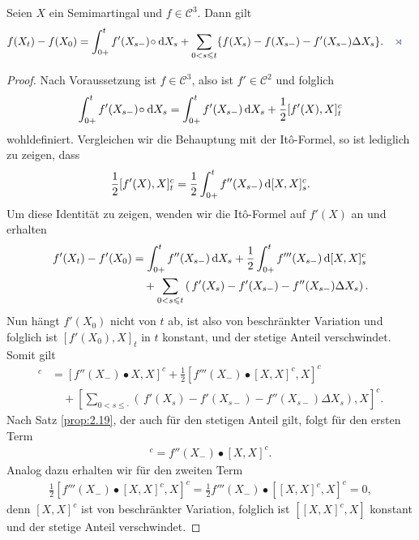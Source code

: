 \begin{theorem}
  Seien $X$ ein Semimartingal und $f\in\mathcal{C}^3$. Dann gilt
\begin{align*}
  f(X_t)-f(X_0) & = \int_{0+}^t f'(X_{s-})\dcirc \dX_s + \sum_{0<s\le t}
  \{f(X_s)-f(X_{s-}) -f'(X_{s-}) \Delta X_s \}.\fish
\end{align*}
\end{theorem}
\begin{proof}
Nach Voraussetzung ist $f\in \mathcal{C}^3$, also ist $f'\in\mathcal{C}^2$ und
folglich
\begin{align*}
\int_{0+}^t f'(X_{s-})\!\circ\! \,\mathrm{d} X_s = 
\int_{0+}^t f'(X_{s-}) \,\mathrm{d} X_s + \frac{1}{2}[f'(X),X]^c_t
\end{align*}
wohldefiniert. Vergleichen wir die Behauptung mit der Itô-Formel, so ist
lediglich zu zeigen, dass
\begin{align*}
\frac{1}{2}[f'(X),X]_t^c = 
\frac{1}{2}\int_{0+}^t f''(X_{s-})\,\mathrm{d}[X,X]_s^c.
\end{align*}
Um diese Identität zu zeigen, wenden wir die Itô-Formel auf $f'(X)$ an und
erhalten
\begin{align*}
f'(X_t)-f'(X_0) 
  & = \int_{0+}^t f''(X_{s-})\,\mathrm{d} X_s + \frac{1}{2} \int_{0+}^t f'''(X_{s-})\,
  \mathrm{d}[X,X]_s^c \\
  & \quad + \sum_{0<s\leqslant t} \left(\,f'(X_s)-f'(X_{s-}) -f''(X_{s-}) \Delta
  X_s\right).
\end{align*}
Nun hängt $f'(X_0)$ nicht von $t$ ab, ist also von beschränkter Variation und
folglich ist $[f'(X_0),X]_t$ in $t$ konstant, und der stetige Anteil
verschwindet.
Somit gilt
\begin{align*}
[f'(X),X]^c &=
[f''(X_-)\bullet X,X]^c + \frac{1}{2} [f'''(X_-)\bullet [X,X]^c ,X]^c\\
&\quad + \left[\sum_{0<s\le \cdot} \left(\,f'(X_s)-f'(X_{s-}) -f''(X_{s-})
\Delta X_s\right),X\right]^c.
\end{align*}
Nach Satz \ref{prop:2.19}, der auch für den stetigen Anteil gilt, folgt für den
ersten Term
\begin{align*}
[f''(X_-)\bullet X,X]^c = f''(X_-)\bullet [X,X]^c.
\end{align*}
Analog dazu erhalten wir für den zweiten Term
\begin{align*}
\frac{1}{2} [f'''(X_-)\bullet [X,X]^c ,X]^c = 
\frac{1}{2} f'''(X_-)\bullet [[X,X]^c ,X]^c = 0,
\end{align*}
denn $[X,X]^c$ ist von beschränkter Variation, folglich ist $[[X,X]^c ,X]$
konstant und der stetige Anteil verschwindet.


\end{proof}
